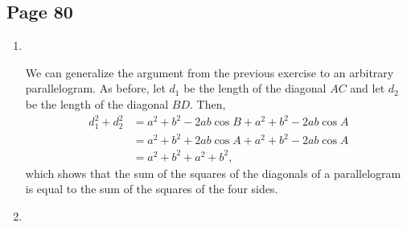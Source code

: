\documentclass{article}
\newenvironment{solutions}[1]
{\subsection*{#1}
 \begin{enumerate}[leftmargin=1.5em]}
{\end{enumerate}}
\newcommand{\solution}{\item}
\begin{document}
\begin{solutions}{Page 80}
In the above diagram of a parallelogram with side lengths of 3 and 12, let $d_1$ be the length of the diagonal $AC$ and let $d_2$ be the length of the diagonal $BD$. By the Law of Cosines, we know that
\[
d_1^2 = 3^2+12^2-2(3)(12)\cos{B}
\]
and
\[
d_2^2 = 3^2+12^2-2(3)(12)\cos{A}.
\]
However, since adjacent angles in a parallelogram are supplementary, $\cos{B} = -\cos{A}$. Therefore,
\begin{align*}
d_1^2 + d_2^2 &= \left(3^2+12^2-2(3)(12)\cos{B}\right) + \left( 3^2+12^2-2(3)(12)\cos{A}\right) \\
&= \left(3^2+12^2+2(3)(12)\cos{A}\right) + \left( 3^2+12^2-2(3)(12)\cos{A}\right) \\
&= 3^2 + 12^2 + 3^2 + 12^2 \\
&= 306
\end{align*}
Thus, the answer does not depend on the specific shape of the parallelogram. Only the side lengths are pertinent.

\solution ~ %
\begin{center}
\end{center}
We can generalize the argument from the previous exercise to an arbitrary parallelogram. As before, let $d_1$ be the length of the diagonal $AC$ and let $d_2$ be the length of the diagonal $BD$. Then,
\begin{align*}
d_1^2 + d_2^2 &= a^2+b^2-2ab\cos{B} + a^2+b^2-2ab\cos{A} \\
&= a^2+b^2+2ab\cos{A} + a^2+b^2-2ab\cos{A} \\
&= a^2+b^2+a^2+b^2,
\end{align*}
which shows that the sum of the squares of the diagonals of a parallelogram is equal to the sum of the squares of the four sides.

\solution ~ %
\begin{center}
\end{center}
\end{solutions}
\end{document}
